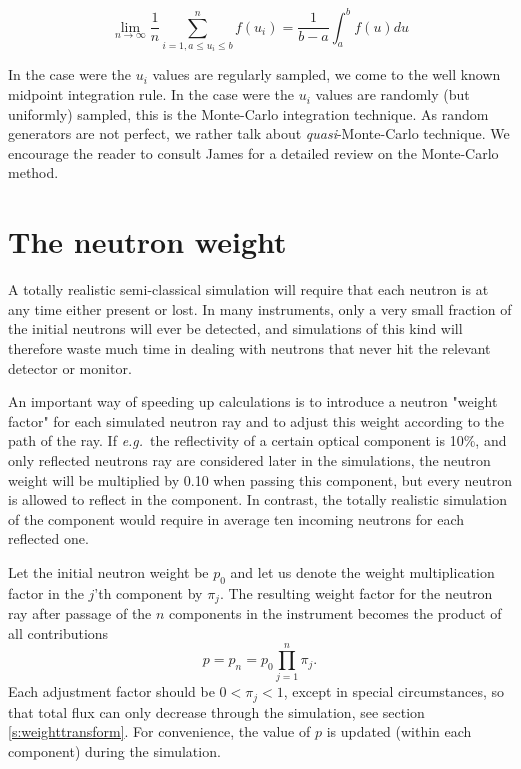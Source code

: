 \begin{equation}
\lim_{n \rightarrow \infty} \frac{1}{n} \sum_{i=1, a \leq u_i \leq b}^n f(u_i) = \frac{1}{b-a}\int_a^b f(u) du
\end{equation}

In the case were the $u_i$ values are regularly sampled, we come to the well known midpoint integration rule. In the case were the $u_i$ values are randomly (but uniformly) sampled, this is the Monte-Carlo integration technique. As random generators are not perfect, we rather talk about \emph{quasi}-Monte-Carlo technique. We encourage the reader to consult James \cite{James80} for a detailed review on the Monte-Carlo method.

\section{The neutron weight}
\label{s:probweight}

A totally realistic semi-classical simulation will require that
each neutron is at any time either present or lost.
In many instruments, only a very
small fraction of the initial neutrons will ever be detected, and
simulations of this kind will therefore waste much time in dealing
with neutrons that never hit the relevant detector or monitor.

An important way of speeding up calculations is to introduce
a neutron "weight factor" for each simulated neutron ray and to
adjust this weight according to the path of the ray.
If {\em e.g.}\ the reflectivity of a certain
optical component is 10\%, and only reflected neutrons ray are
considered later in the simulations, the neutron
weight will be multiplied by 0.10 when passing this component,
but every neutron is allowed to reflect in the component.
In contrast, the totally realistic simulation of the component
would require in average ten incoming neutrons for each reflected one.

Let the initial neutron weight be $p_0$ and let us denote the weight
multiplication factor in the $j$'th component by $\pi_j$.  The resulting
weight factor for the neutron ray after passage of the $n$ components in the instrument
becomes the product of all contributions
\begin{equation}
\label{e:probprod}
p = p_n = p_0 \prod_{j=1}^n \pi_j .
\end{equation}
Each adjustment factor should be $0 < \pi_j < 1$, except in special
circumstances, so that total flux can only decrease through the
simulation, see section \ref{s:weighttransform}. For convenience, the value of $p$ is updated (within each component)
during the simulation.

